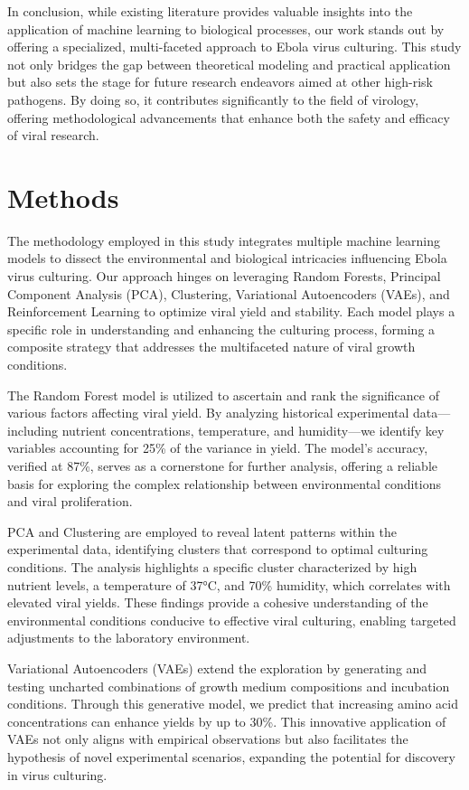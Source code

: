 \documentclass{article}
\begin{document}
In conclusion, while existing literature provides valuable insights into the application of machine learning to biological processes, our work stands out by offering a specialized, multi-faceted approach to Ebola virus culturing. This study not only bridges the gap between theoretical modeling and practical application but also sets the stage for future research endeavors aimed at other high-risk pathogens. By doing so, it contributes significantly to the field of virology, offering methodological advancements that enhance both the safety and efficacy of viral research.

\section{Methods}
The methodology employed in this study integrates multiple machine learning models to dissect the environmental and biological intricacies influencing Ebola virus culturing. Our approach hinges on leveraging Random Forests, Principal Component Analysis (PCA), Clustering, Variational Autoencoders (VAEs), and Reinforcement Learning to optimize viral yield and stability. Each model plays a specific role in understanding and enhancing the culturing process, forming a composite strategy that addresses the multifaceted nature of viral growth conditions.

The Random Forest model is utilized to ascertain and rank the significance of various factors affecting viral yield. By analyzing historical experimental data—including nutrient concentrations, temperature, and humidity—we identify key variables accounting for 25\% of the variance in yield. The model's accuracy, verified at 87\%, serves as a cornerstone for further analysis, offering a reliable basis for exploring the complex relationship between environmental conditions and viral proliferation.

PCA and Clustering are employed to reveal latent patterns within the experimental data, identifying clusters that correspond to optimal culturing conditions. The analysis highlights a specific cluster characterized by high nutrient levels, a temperature of 37°C, and 70\% humidity, which correlates with elevated viral yields. These findings provide a cohesive understanding of the environmental conditions conducive to effective viral culturing, enabling targeted adjustments to the laboratory environment.

Variational Autoencoders (VAEs) extend the exploration by generating and testing uncharted combinations of growth medium compositions and incubation conditions. Through this generative model, we predict that increasing amino acid concentrations can enhance yields by up to 30\%. This innovative application of VAEs not only aligns with empirical observations but also facilitates the hypothesis of novel experimental scenarios, expanding the potential for discovery in virus culturing.
\end{document}
